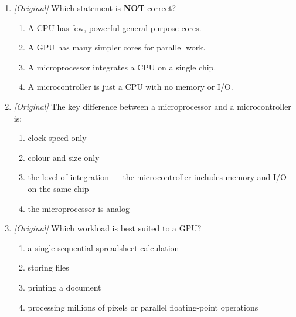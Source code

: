 \documentclass[11pt]{article}
\begin{document}
\begin{enumerate}[label=\textbf{Q\arabic*.}, leftmargin=*]
\begin{enumerate}[label=\Alph*.]
  \end{enumerate}
\item \textit{[Original]} Which statement is \textbf{NOT} correct?
  \begin{enumerate}[label=\Alph*.]
    \item A CPU has few, powerful general-purpose cores.
    \item A GPU has many simpler cores for parallel work.
    \item A microprocessor integrates a CPU on a single chip.
    \item A microcontroller is just a CPU with no memory or I/O.
  \end{enumerate}
\item \textit{[Original]} The key difference between a microprocessor and a
  microcontroller is:
  \begin{enumerate}[label=\Alph*.]
    \item clock speed only
    \item colour and size only
    \item the level of integration --- the microcontroller includes memory
      and I/O on the same chip
    \item the microprocessor is analog
  \end{enumerate}
\item \textit{[Original]} Which workload is best suited to a GPU?
  \begin{enumerate}[label=\Alph*.]
    \item a single sequential spreadsheet calculation
    \item storing files
    \item printing a document
    \item processing millions of pixels or parallel floating-point operations
  \end{enumerate}


\end{enumerate}
\end{document}
